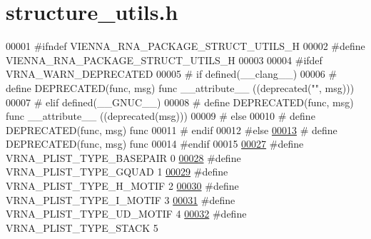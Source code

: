 \hypertarget{structure__utils_8h_source}{}\section{structure\+\_\+utils.\+h}
\label{structure__utils_8h_source}

\begin{DoxyCode}
00001 \textcolor{preprocessor}{#ifndef VIENNA\_RNA\_PACKAGE\_STRUCT\_UTILS\_H}
00002 \textcolor{preprocessor}{#define VIENNA\_RNA\_PACKAGE\_STRUCT\_UTILS\_H}
00003 
00004 \textcolor{preprocessor}{#ifdef VRNA\_WARN\_DEPRECATED}
00005 \textcolor{preprocessor}{# if defined(\_\_clang\_\_)}
00006 \textcolor{preprocessor}{#  define DEPRECATED(func, msg) func \_\_attribute\_\_ ((deprecated("", msg)))}
00007 \textcolor{preprocessor}{# elif defined(\_\_GNUC\_\_)}
00008 \textcolor{preprocessor}{#  define DEPRECATED(func, msg) func \_\_attribute\_\_ ((deprecated(msg)))}
00009 \textcolor{preprocessor}{# else}
00010 \textcolor{preprocessor}{#  define DEPRECATED(func, msg) func}
00011 \textcolor{preprocessor}{# endif}
00012 \textcolor{preprocessor}{#else}
\mbox{\hyperlink{structure__utils_8h_aab347a3c03fbe8e7319551b9fa0cce4a}{00013}} \textcolor{preprocessor}{# define DEPRECATED(func, msg) func}
00014 \textcolor{preprocessor}{#endif}
00015 
\mbox{\hyperlink{group__struct__utils_ga7c7484a8a1e6704b1aefaf589f3b27c1}{00027}} \textcolor{preprocessor}{#define VRNA\_PLIST\_TYPE\_BASEPAIR      0}
\mbox{\hyperlink{group__struct__utils_gac91ab79e9feede5347103949ecf04f8a}{00028}} \textcolor{preprocessor}{#define VRNA\_PLIST\_TYPE\_GQUAD         1}
\mbox{\hyperlink{group__struct__utils_ga4d142e0187b8410b61ec2b168ed4513e}{00029}} \textcolor{preprocessor}{#define VRNA\_PLIST\_TYPE\_H\_MOTIF       2}
\mbox{\hyperlink{group__struct__utils_gadf5905518079b5495bce3394cd7afb9a}{00030}} \textcolor{preprocessor}{#define VRNA\_PLIST\_TYPE\_I\_MOTIF       3}
\mbox{\hyperlink{group__struct__utils_ga01d749cdb675dcdbac1dc5103378c699}{00031}} \textcolor{preprocessor}{#define VRNA\_PLIST\_TYPE\_UD\_MOTIF      4}
\mbox{\hyperlink{group__struct__utils_ga36df728a95452170ca8684fc224299ea}{00032}} \textcolor{preprocessor}{#define VRNA\_PLIST\_TYPE\_STACK         5}

\end{DoxyCode}
